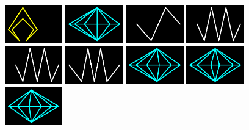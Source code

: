 \begin{figure}[H]
    \includegraphics[width=2.5cm]{preface/vector_images/vec_image_lifey.png}
    \includegraphics[width=2.5cm]{preface/vector_images/vec_image_msauce.png}
    \includegraphics[width=2.5cm]{preface/vector_images/vec_image_puls1.png}
    \includegraphics[width=2.5cm]{preface/vector_images/vec_image_puls2.png}
    \includegraphics[width=2.5cm]{preface/vector_images/vec_image_puls3.png}
    \includegraphics[width=2.5cm]{preface/vector_images/vec_image_puls4.png}
    \includegraphics[width=2.5cm]{preface/vector_images/vec_image_sa2pic.png}
    \includegraphics[width=2.5cm]{preface/vector_images/vec_image_sa3pic.png}
    \includegraphics[width=2.5cm]{preface/vector_images/vec_image_sa4pic.png}

\end{figure}
